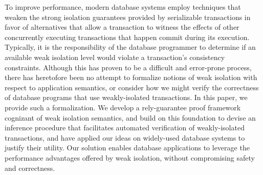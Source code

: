 To improve performance, modern database systems employ techniques that
weaken the strong isolation guarantees provided by serializable
transactions in favor of alternatives that allow a transaction to
witness the effects of other concurrently executing transactions that
happen commit during its execution.  Typically, it is the
responsibility of the database programmer to determine if an available
weak isolation level would violate a transaction's consistency
constraints.  Although this has proven to be a difficult and
error-prone process, there has heretofore been no attempt to formalize
notions of weak isolation with respect to application semantics, or
consider how we might verify the correctness of database programs that
use weakly-isolated transactions.  In this paper, we provide such a
formalization.  We develop a rely-guarantee proof framework cognizant
of weak isolation semantics, and build on this foundation to devise an
inference procedure that facilitates automated verification of
weakly-isolated transactions, and have applied our ideas on
widely-used database systems to justify their utility.  Our solution
enables database applications to leverage the performance advantages
offered by weak isolation, without compromising safety and
correctness.




